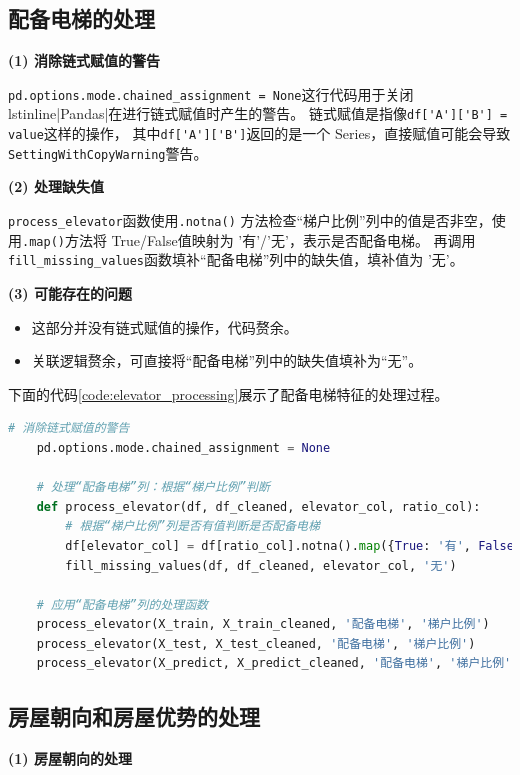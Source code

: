 \documentclass[
    report,     %
    oneside,    %
    UTF8,       %
    zihao=-4    %
]{config} %
\begin{document}
\subsection{配备电梯的处理}
\textbf{(1) 消除链式赋值的警告}

\lstinline|pd.options.mode.chained_assignment = None|这行代码用于关闭lstinline|Pandas|在进行链式赋值时产生的警告。
链式赋值是指像\lstinline|df['A']['B'] = value|这样的操作，
其中\lstinline|df['A']['B']|返回的是一个 Series，直接赋值可能会导致\lstinline|SettingWithCopyWarning|警告。

\textbf{(2) 处理缺失值}

\lstinline|process_elevator|函数使用\lstinline|.notna()|
方法检查“梯户比例”列中的值是否非空，使用\lstinline|.map()|方法将
True/False值映射为 '有'/'无'，表示是否配备电梯。
再调用\lstinline|fill_missing_values|函数填补“配备电梯”列中的缺失值，填补值为 '无'。

\textbf{(3) 可能存在的问题}
\begin{itemize}
    \item 这部分并没有链式赋值的操作，代码赘余。
    \item 关联逻辑赘余，可直接将“配备电梯”列中的缺失值填补为“无”。
\end{itemize}

下面的代码\ref{code:elevator_processing}展示了配备电梯特征的处理过程。
\begin{lstlisting}[label=code:elevator_processing, language=Python, caption=配备电梯的处理代码]
    # 消除链式赋值的警告
    pd.options.mode.chained_assignment = None
    
    # 处理“配备电梯”列：根据“梯户比例”判断
    def process_elevator(df, df_cleaned, elevator_col, ratio_col):
        # 根据“梯户比例”列是否有值判断是否配备电梯
        df[elevator_col] = df[ratio_col].notna().map({True: '有', False: '无'})
        fill_missing_values(df, df_cleaned, elevator_col, '无')
    
    # 应用“配备电梯”列的处理函数
    process_elevator(X_train, X_train_cleaned, '配备电梯', '梯户比例')
    process_elevator(X_test, X_test_cleaned, '配备电梯', '梯户比例')
    process_elevator(X_predict, X_predict_cleaned, '配备电梯', '梯户比例')
\end{lstlisting}

\subsection{房屋朝向和房屋优势的处理}

\textbf{(1) 房屋朝向的处理}
\end{document}
